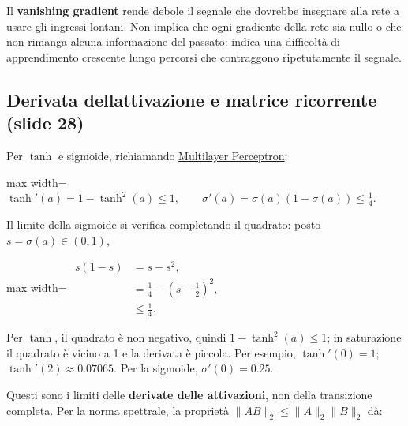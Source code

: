 \documentclass[11pt,a4paper,oneside,openany]{book}
\begin{document}
Il \textbf{vanishing gradient} rende debole il segnale che dovrebbe insegnare alla rete a usare gli ingressi lontani. Non implica che ogni gradiente della rete sia nullo o che non rimanga alcuna informazione del passato: indica una difficoltà di apprendimento crescente lungo percorsi che contraggono ripetutamente il segnale.

\subsection{Derivata dell\textquotesingle attivazione e matrice ricorrente (slide 28)}\label{f03-r583}

Per \(\tanh\) e sigmoide, richiamando \hyperref[fonte01]{Multilayer Perceptron}:

\begin{center}
\begin{adjustbox}{max width=\linewidth}
$\displaystyle 
\boxed{\tanh'(a)=1-\tanh^2(a)\leq1,\qquad
\sigma'(a)=\sigma(a)(1-\sigma(a))\leq\tfrac14.}
$
\end{adjustbox}
\end{center}

Il limite della sigmoide si verifica completando il quadrato: posto \(s=\sigma(a)\in(0,1)\),

\begin{center}
\begin{adjustbox}{max width=\linewidth}
$\displaystyle 
\begin{aligned}
s(1-s)&=s-s^2,\\
&=\frac14-\left(s-\frac12\right)^2,\\
&\leq\frac14.
\end{aligned}
$
\end{adjustbox}
\end{center}

Per \(\tanh\), il quadrato è non negativo, quindi \(1-\tanh^2(a)\leq1\); in saturazione il quadrato è vicino a 1 e la derivata è piccola. Per esempio, \(\tanh'(0)=1\); \(\tanh'(2)\approx0.07065\). Per la sigmoide, \(\sigma'(0)=0.25\).

Questi sono i limiti delle \textbf{derivate delle attivazioni}, non della transizione completa. Per la norma spettrale, la proprietà \(\|AB\|_2\leq\|A\|_2\|B\|_2\) dà:
\end{document}
